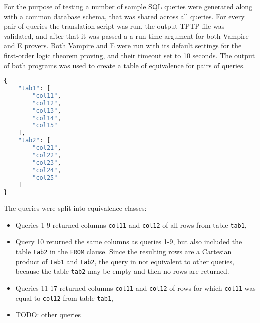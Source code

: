\documentclass[magisterska,en]{pracamgr}
\newcommand{\code}[1]{\texttt{#1}}
\begin{document}
For the purpose of testing a number of sample SQL queries were generated along with a common database schema, that was shared across all queries. For every pair of queries the translation script was run, the output TPTP file was validated, and after that it was passed a a run-time argument for both Vampire and E provers.
Both Vampire and E were run with its default settings for the first-order logic theorem proving, and their timeout set to 10 seconds. The output of both programs was used to create a table of equivalence for pairs of queries.
\begin{lstlisting}[language=Python, caption=Database schema]
{
    "tab1": [
        "col11",
        "col12",
        "col13",
        "col14",
        "col15"
    ],
    "tab2": [
        "col21",
        "col22",
        "col23",
        "col24",
        "col25"
    ]
}
\end{lstlisting}
The queries were split into equivalence classes:
\begin{itemize}
    \item Queries 1-9 returned columns \code{col11} and \code{col12} of all rows from table \code{tab1},
    \item Query 10 returned the same columns as queries 1-9, but also included the table \code{tab2} in the \code{FROM} clause. Since the resulting rows are a Cartesian product of \code{tab1} and \code{tab2}, the query in not equivalent to other queries, because the table \code{tab2} may be empty and then no rows are returned.
    \item Queries 11-17 returned columns \code{col11} and \code{col12} of rows for which \code{col11} was equal to \code{col12} from table \code{tab1},
    \item TODO: other queries
\end{itemize}



\newcommand{\EQ}{\textcolor{ForestGreen}{\code{EQ}}}
\newcommand{\NF}{\textcolor{orange}{\code{NF}}}
\newcommand{\NE}{\textcolor{red}{\code{NE}}}
\newcommand{\TO}{\textcolor{gray}{\code{TO}}}
\newcommand{\ER}{\textcolor{black}{\code{ER}}}
\end{document}

